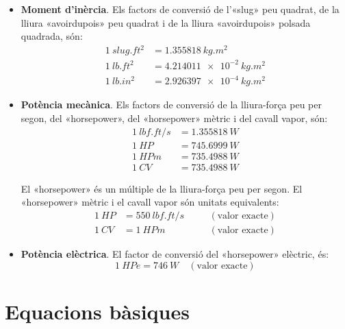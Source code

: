 \begin{itemize}
    \item \textbf{Moment d'inèrcia}. Els factors de conversió de l'«slug» peu quadrat, de la lliura «avoirdupois» peu quadrat   i de la lliura «avoirdupois» polsada quadrada, són:
    \begin{subequations}
    \begin{align}
        \SI{1}{slug.ft^2} &= \SI{1,355818}{kg.m^2} \\
        \SI{1}{lb.ft^2} &= \SI{4,214011e-2}{kg.m^2} \\
        \SI{1}{lb.in^2} &= \SI{2,926397e-4}{kg.m^2}
    \end{align}
    \end{subequations}

    \item \textbf{Potència mecànica}. Els factors de conversió de la lliura-força peu per segon, del «horsepower»,  del «horsepower» mètric i del cavall vapor, són:
    \begin{subequations}
    \begin{align}
      \SI{1}{lbf.ft/s} &= \SI{1,355818}{W} \\
      \SI{1}{HP} &= \SI{745,6999}{W} \\
      \SI{1}{HPm} &= \SI{735,4988}{W} \\
      \SI{1}{CV} &= \SI{735,4988}{W}
    \end{align}
    \end{subequations}

    El «horsepower» és un múltiple  de la lliura-força peu per segon. El «horsepower» mètric i el cavall vapor són unitats equivalents:
    \begin{subequations}
    \begin{alignat}{3}
      \SI{1}{HP} &= \SI{550}{lbf.ft/s}  &&\quad(\text{valor exacte}) \\
      \SI{1}{CV} &= \SI{1}{HPm} &&\quad(\text{valor exacte})
    \end{alignat}
    \end{subequations}


    \item \textbf{Potència elèctrica}. El factor de conversió del
    «horsepower» elèctric, és:
    \begin{equation}
        \SI{1}{HPe} = \SI{746}{W}\quad(\text{valor exacte})
    \end{equation}
  \end{itemize}


\section{Equacions bàsiques}

